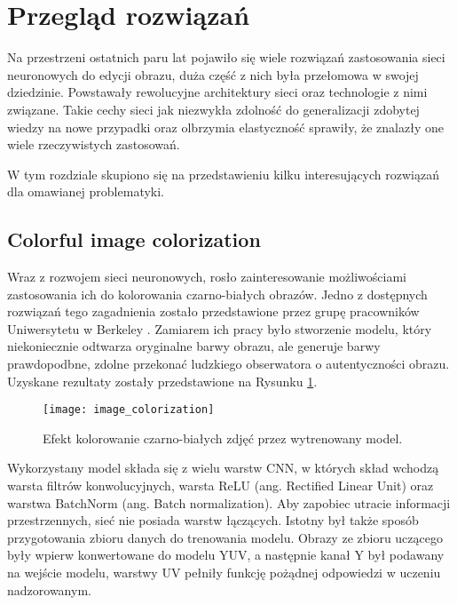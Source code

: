 \section{Przegląd rozwiązań}
  Na przestrzeni ostatnich paru lat pojawiło się wiele rozwiązań zastosowania
  sieci neuronowych do edycji obrazu, duża część z nich była przełomowa w
  swojej dziedzinie. Powstawały rewolucyjne architektury sieci oraz technologie
  z nimi związane. Takie cechy sieci jak niezwykła zdolność do generalizacji zdobytej wiedzy na nowe przypadki oraz olbrzymia elastyczność sprawiły, że
  znalazły one wiele rzeczywistych zastosowań.

  W tym rozdziale skupiono się na przedstawieniu kilku interesujących rozwiązań
  dla omawianej problematyki.

  \subsection{Colorful image colorization}

    Wraz z rozwojem sieci neuronowych, rosło zainteresowanie możliwościami zastosowania
    ich do kolorowania czarno-białych obrazów. Jedno z dostępnych rozwiązań tego
    zagadnienia zostało przedstawione przez grupę pracowników Uniwersytetu w
    Berkeley \cite{colorful_image_colorization}. Zamiarem ich pracy było stworzenie
    modelu, który niekoniecznie odtwarza oryginalne barwy obrazu, ale generuje
    barwy prawdopodbne, zdolne przekonać ludzkiego obserwatora o autentyczności
    obrazu. Uzyskane rezultaty zostały przedstawione na
    Rysunku \ref{fig:colorful_image_colorization}.

    \begin{figure}[ht]
      \centering
      \texttt{[image: image\_colorization]}
      \caption{Efekt kolorowanie czarno-białych zdjęć przez wytrenowany model.}
      \label{fig:colorful_image_colorization}
    \end{figure}

    Wykorzystany model składa się z wielu warstw CNN, w których skład wchodzą
    warsta filtrów konwolucyjnych, warsta ReLU (ang. Rectified
    Linear Unit) oraz warstwa BatchNorm (ang. Batch normalization).
    Aby zapobiec utracie informacji przestrzennych, sieć nie posiada warstw łączących.
    Istotny był także sposób
    przygotowania zbioru danych do trenowania modelu. Obrazy ze zbioru uczącego
    były wpierw konwertowane do modelu YUV, a następnie kanał Y był podawany na
    wejście modelu, warstwy UV pełniły funkcję pożądnej odpowiedzi w uczeniu
    nadzorowanym.

